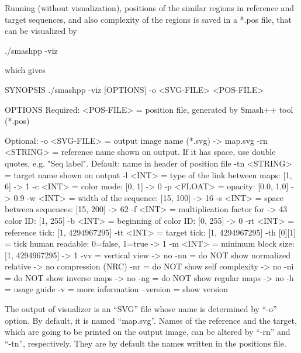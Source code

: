 Running \smashpp (without visualization), positions of the similar regions in reference and target sequences, and also complexity of the regions is saved in a *.pos file, that can be visualized by
\begin{code}[style=bash]
./smashpp -viz
\end{code}
which gives
\begin{code}[style=bash]
SYNOPSIS
  ./smashpp -viz [OPTIONS]  -o <SVG-FILE>  <POS-FILE>

OPTIONS
  Required:
  <POS-FILE>         = position file, generated by
                       Smash++ tool (*.pos)

  Optional:
  -o  <SVG-FILE>     = output image name (*.svg)             -> map.svg
  -rn <STRING>       = reference name shown on output. If it
                       has space, use double quotes, e.g.
                       "Seq label". Default: name in header
                       of position file
  -tn <STRING>       = target name shown on output
  -l  <INT>          = type of the link between maps: [1, 6] -> 1
  -c  <INT>          = color mode: [0, 1]                    -> 0
  -p  <FLOAT>        = opacity: [0.0, 1.0]                   -> 0.9
  -w  <INT>          = width of the sequence: [15, 100]      -> 16
  -s  <INT>          = space between sequences: [15, 200]    -> 62
  -f  <INT>          = multiplication factor for             -> 43
                       color ID: [1, 255]
  -b  <INT>          = beginning of color ID: [0, 255]       -> 0
  -rt <INT>          = reference tick: [1, 4294967295]
  -tt <INT>          = target tick: [1, 4294967295]
  -th [0][1]         = tick human readable: 0=false, 1=true  -> 1
  -m  <INT>          = minimum block size: [1, 4294967295]   -> 1
  -vv                = vertical view                         -> no
  -nn                = do NOT show normalized relative       -> no
                       compression (NRC)
  -nr                = do NOT show self complexity           -> no
  -ni                = do NOT show inverse maps              -> no
  -ng                = do NOT show regular maps              -> no
  -h                 = usage guide
  -v                 = more information
  --version          = show version
\end{code}

The output of \smashpp visualizer is an ``SVG'' file whose name is determined by ``-o'' option. By default, it is named ``map.svg''. 
Names of the reference and the target, which are going to be printed on the output image, can be altered by ``-rn'' and ``-tn'', respectively. They are by default the names written in the positions file. 

